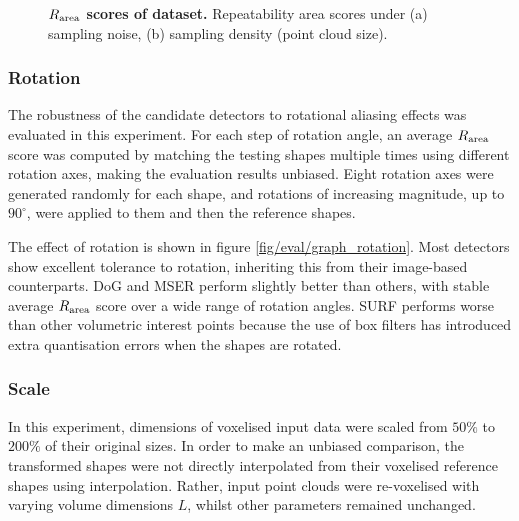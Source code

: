\begin{figure}[ht]
\begin{subfigure}[t]{0.48\linewidth}
		\label{fig/eval/graph_sample}
	\end{subfigure}
	\caption{\textbf{$R_\textrm{area}$ scores of \meshset dataset.} Repeatability area scores under (a) sampling noise, (b) sampling density (point cloud size).}
	\label{fig/eval/graph_graph0} 
\end{figure}

\subsubsection{Rotation}

The robustness of the candidate detectors to rotational aliasing effects was evaluated in this experiment. For each step of rotation angle, an average $R_\textrm{area}$ score was computed by matching the testing shapes multiple times using different rotation axes, making the evaluation results unbiased. Eight rotation axes were generated randomly for each shape, and rotations of increasing magnitude, up to $90^\circ$, were applied to them and then the reference shapes. 

The effect of rotation is shown in figure \ref{fig/eval/graph_rotation}. Most detectors show excellent tolerance to rotation, inheriting this from their image-based counterparts. 
DoG and MSER perform slightly better than others, with stable average $R_\textrm{area}$ score over a wide range of rotation angles. SURF performs worse than other volumetric interest points because the use of box filters has introduced extra quantisation errors when the shapes are rotated.

\subsubsection{Scale}

In this experiment, dimensions of voxelised input data were scaled from $50\%$ to $200\%$ of their original sizes. In order to make an unbiased comparison, the transformed shapes were not directly interpolated from their voxelised reference shapes using interpolation. Rather, input point clouds were re-voxelised with varying volume dimensions $L$, whilst other parameters remained unchanged. 

